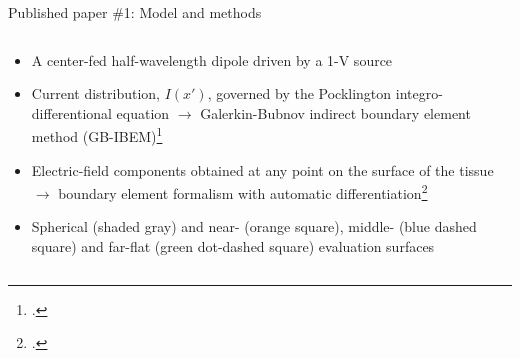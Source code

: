 \documentclass[xcolor=dvipsnames,10pt]{beamer}
\begin{document}
\begin{frame}{Published paper \#1: Model and methods}
\begin{onlyenv}
\begin{columns}[c]
\begin{column}{0.6\textwidth}
                \begin{itemize}
                    \item<2> A center-fed half-wavelength dipole driven by a 1-V source
                    \item<3> Current distribution, $I(x')$, governed by the Pocklington integro-differentional equation $\rightarrow$ Galerkin-Bubnov indirect boundary element method (GB-IBEM)\footcite{Poljak2006Advanced}
                    \item<4> Electric-field components obtained at any point on the surface of the tissue $\rightarrow$ boundary element formalism with automatic differentiation\footcite{Kapetanovic2021Application}
                    \item<5> Spherical (shaded gray) and near- (orange square), middle- (blue dashed square) and far-flat (green dot-dashed square) evaluation surfaces
                \end{itemize}
            \end{column}
        \end{columns}  
    \end{onlyenv}
\end{frame}
\end{document}

